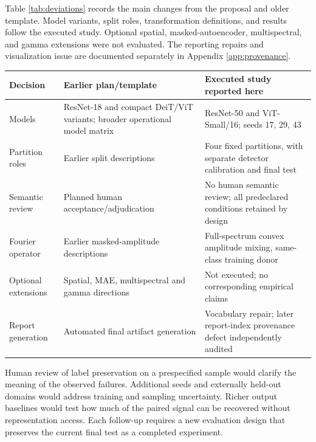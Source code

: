 Table \ref{tab:deviations} records the main changes from the proposal and older template. Model variants, split roles, transformation definitions, and results follow the executed study. Optional spatial, masked-autoencoder, multispectral, and gamma extensions were not evaluated. The reporting repairs and visualization issue are documented separately in Appendix \ref{app:provenance}.

\stopcolumns
\noindent
\begin{minipage}{\textwidth}
\centering
{}\label{tab:deviations}
\begin{tabular}{p{}p{}p{}}\toprule
Decision & Earlier plan/template & Executed study reported here \\\midrule
Models & ResNet-18 and compact DeiT/ViT variants; broader operational model matrix & ResNet-50 and ViT-Small/16; seeds 17, 29, 43 \\
Partition roles & Earlier split descriptions & Four fixed partitions, with separate detector calibration and final test \\
Semantic review & Planned human acceptance/adjudication & No human semantic review; all predeclared conditions retained by design \\
Fourier operator & Earlier masked-amplitude descriptions & Full-spectrum convex amplitude mixing, same-class training donor \\
Optional extensions & Spatial, MAE, multispectral and gamma directions & Not executed; no corresponding empirical claims \\
Report generation & Automated final artifact generation & Vocabulary repair; later report-index provenance defect independently audited \\\bottomrule
\end{tabular}
\end{minipage}
\par\startcolumns

Human review of label preservation on a prespecified sample would clarify the meaning of the observed failures. Additional seeds and externally held-out domains would address training and sampling uncertainty. Richer output baselines would test how much of the paired signal can be recovered without representation access. Each follow-up requires a new evaluation design that preserves the current final test as a completed experiment.
